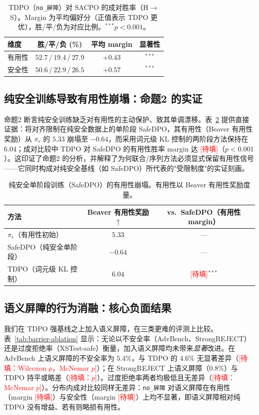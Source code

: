 \documentclass[lettersize,journal]{IEEEtran}
\begin{document}
\begin{table}[t]
\centering
\caption{TDPO（\texttt{no\_屏障}）对 SACPO 的成对胜率（H$\to$S）。Margin 为平均偏好分（正值表示 TDPO 更优），胜/平/负为对应比例。$^{***}p<0.001$。}
\label{tab:tdpo-vs-sacpo}
\begin{tabular}{lccc}
\toprule
维度 & 胜/平/负 (\%) & 平均 margin & 显著性 \\
\midrule
有用性 & $52.7\,/\,19.4\,/\,27.9$ & $+0.43$ & $^{***}$ \\
安全性 & $50.6\,/\,22.9\,/\,26.5$ & $+0.57$ & $^{***}$ \\
\bottomrule
\end{tabular}
\end{table}

\subsection{纯安全训练导致有用性崩塌：命题2 的实证}\label{exp:drift}
命题2 断言纯安全训练缺乏对有用性的主动保护、致其单调漂移。表~\ref{tab:safedpo} 提供直接证据：将对齐限制在纯安全数据上的单阶段 SafeDPO，其有用性（Beaver 有用性奖励）从 $\pi_r$ 的 $5.33$ 崩塌至 $-0.64$，而采用词元级 KL 控制的两阶段方法保持在 $6.04$；成对比较中 TDPO 对 SafeDPO 的有用性胜率 margin 达 \textcolor{red}{[待填]}（$p<0.001$）。这印证了命题2 的分析，并解释了为何联合/序列方法必须显式保留有用性信号——它同时构成对纯安全基线（如 SafeDPO）所代表的"受限制度"的实证刻画。

\begin{table}[t]
\centering
\caption{纯安全单阶段训练（SafeDPO）的有用性崩塌。有用性以 Beaver 有用性奖励度量。}
\label{tab:safedpo}
\begin{tabular}{lcc}
\toprule
方法 & Beaver 有用性奖励 $\uparrow$ & vs.\ SafeDPO（有用性 margin） \\
\midrule
$\pi_r$（有用性初始） & $5.33$ & — \\
SafeDPO（纯安全单阶段） & $-0.64$ & — \\
TDPO（词元级 KL 控制） & $6.04$ & \textcolor{red}{[待填]}$^{***}$ \\
\bottomrule
\end{tabular}
\end{table}

\subsection{语义屏障的行为消融：核心负面结果}\label{exp:barrier}
我们在 TDPO 强基线之上加入语义屏障，在三类更难的评测上比较。表~\ref{tab:barrier-ablation} 显示：无论以不安全率（AdvBench、StrongREJECT）还是过度拒绝率（XSTest-safe）衡量，加入语义屏障均未带来\emph{显著}改进。在 AdvBench 上语义屏障的不安全率为 $5.4\%$，与 TDPO 的 $4.6\%$ 无显著差异（\textcolor{red}{[待填：Wilcoxon $p$，McNemar $p$]}）；在 StrongREJECT 上语义屏障（$0.8\%$）与 TDPO 持平或略差（\textcolor{red}{[待填：$p$]}）。过度拒绝率两者均极低且无差异（\textcolor{red}{[待填：McNemar $p$]}）。分布内成对比较同样无差异：\texttt{no\_屏障} 对语义屏障在有用性（margin \textcolor{red}{[待填]}）与安全性（margin \textcolor{red}{[待填]}）上均不显著，即语义屏障相对纯 TDPO 没有增益、若有则略损有用性。
\end{document}
